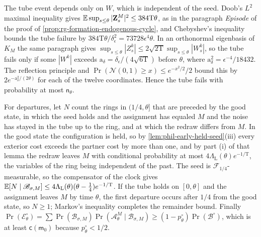 The tube event depends only on \(W\), which is independent of the seed.
Doob's \(L^2\) maximal inequality gives
\(\mathbb E\sup_{s\le\theta}|\mathbf Z^M_s|^2\le384\mathrm T\theta\), as in the
paragraph \emph{Episode} of the proof of
\cref{prop:rg-formation-endogenous-cycle}, and Chebyshev's inequality bounds
the tube failure by \(384\mathrm T\theta/\delta_\epsilon^2=73728\epsilon^4\theta\).
In an orthonormal eigenbasis of \(K_M\) the same paragraph gives
\(\sup_{s\le\theta}|Z^k_s|\le2\sqrt{2\mathrm T}\sup_{s\le\theta}|W^k_s|\), so
the tube fails only if some \(|W^k|\) exceeds
\(\mathrm a_\delta=\delta_\epsilon/(4\sqrt{6\mathrm T})\) before \(\theta\), where
\(\mathrm a_\delta^2=\epsilon^{-4}/18432\). The reflection principle and
\(\Pr(\mathcal N(0,1)\ge x)\le e^{-x^2/2}/2\) bound this by
\(2e^{-\mathrm a_\delta^2/(2\theta)}\) for each of the twelve coordinates. Hence the
tube fails with probability at most \(\mathsf n_\theta\).

For departures, let \(N\) count the rings in \((1/4,\theta]\) that are
preceded by the good state, in which the seed holds and the assignment has
equaled \(M\) and the noise has stayed in the tube up to the ring, and at
which the redraw differs from \(M\). In the good state the configuration is
held, so by \cref{lem:phil-early-held-seed}(iii) every exterior cost exceeds
the partner cost by more than one, and by part (i) of that lemma the redraw
leaves \(M\) with conditional probability at most
\(4\Lambda_{\mathrm L}(\theta)e^{-1/\mathrm T}\), the variables of the ring
being independent of the past. The seed is \(\mathcal F_{1/4}\)-measurable,
so the compensator of the clock gives
\(\mathbb E[N\mid\mathscr B_{\sigma,M}]\le4\Lambda_{\mathrm L}(\theta)
(\theta-\frac14)e^{-1/\mathrm T}\). If the tube holds on \([0,\theta]\) and
the assignment leaves \(M\) by time \(\theta\), the first departure occurs
after \(1/4\) from the good state, so \(N\ge1\); Markov's inequality completes
the remainder bound. Finally
\(\Pr(\mathscr E^\circ_\theta)=\sum\Pr(\mathscr B_{\sigma,M})
\Pr(\mathscr A^M_\theta\mid\mathscr B_{\sigma,M})\ge(1-p^\circ_\theta)
\Pr(\mathscr B^\circ)\), which is at least \(\mathsf c(\mathsf m_0)\) because
\(p^\circ_\theta<1/2\).

